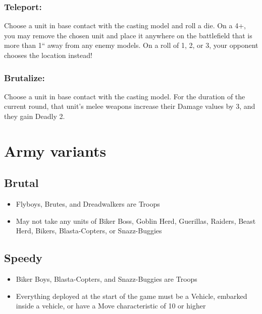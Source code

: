 \subsubsection*{Teleport:} Choose a unit in base contact with the casting model and roll a die. On a 4+, you may remove the chosen unit and place it anywhere on the battlefield that is more than 1`` away from any enemy models. On a roll of 1, 2, or 3, your opponent chooses the location instead!

\subsubsection*{Brutalize:} Choose a unit in base contact with the casting model. For the duration of the current round, that unit's melee weapons increase their Damage values by 3, and they gain Deadly 2.


\section*{Army variants}
\subsection*{Brutal}
\begin{itemize}
    \item Flyboys, Brutes, and Dreadwalkers are Troops
    \item May not take any units of Biker Boss, Goblin Herd, Guerillas, Raiders, Beast Herd, Bikers, Blasta-Copters, or Snazz-Buggies
\end{itemize}

\subsection*{Speedy}
\begin{itemize}
    \item Biker Boys, Blasta-Copters, and Snazz-Buggies are Troops
    \item Everything deployed at the start of the game must be a Vehicle, embarked inside a vehicle, or have a Move characteristic of 10 or higher
\end{itemize}




\pagebreak



